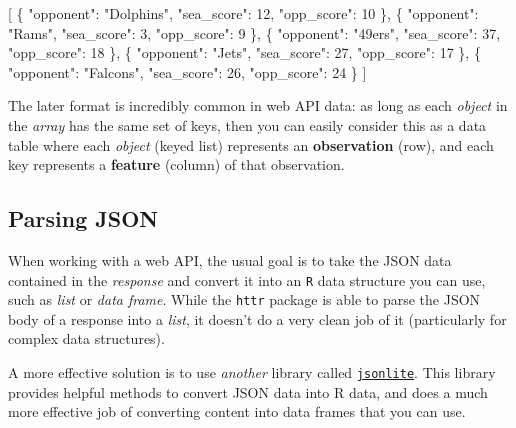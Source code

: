 \documentclass[]{book}
\newenvironment{Shaded}{\begin{snugshade}}{\end{snugshade}}
\newcommand{\DataTypeTok}[1]{\textcolor[rgb]{0.13,0.29,0.53}{#1}}
\newcommand{\DecValTok}[1]{\textcolor[rgb]{0.00,0.00,0.81}{#1}}
\newcommand{\StringTok}[1]{\textcolor[rgb]{0.31,0.60,0.02}{#1}}
\newcommand{\OtherTok}[1]{\textcolor[rgb]{0.56,0.35,0.01}{#1}}
\newcommand{\FunctionTok}[1]{\textcolor[rgb]{0.00,0.00,0.00}{#1}}
\theoremstyle{definition}
\theoremstyle{definition}
\theoremstyle{remark}
\begin{document}
\begin{Shaded}
\begin{Highlighting}[]
\OtherTok{[}
  \FunctionTok{\{} \DataTypeTok{"opponent"}\FunctionTok{:} \StringTok{"Dolphins"}\FunctionTok{,} \DataTypeTok{"sea_score"}\FunctionTok{:} \DecValTok{12}\FunctionTok{,} \DataTypeTok{"opp_score"}\FunctionTok{:} \DecValTok{10} \FunctionTok{\}}\OtherTok{,}
  \FunctionTok{\{} \DataTypeTok{"opponent"}\FunctionTok{:} \StringTok{"Rams"}\FunctionTok{,} \DataTypeTok{"sea_score"}\FunctionTok{:} \DecValTok{3}\FunctionTok{,} \DataTypeTok{"opp_score"}\FunctionTok{:} \DecValTok{9} \FunctionTok{\}}\OtherTok{,}
  \FunctionTok{\{} \DataTypeTok{"opponent"}\FunctionTok{:} \StringTok{"49ers"}\FunctionTok{,} \DataTypeTok{"sea_score"}\FunctionTok{:} \DecValTok{37}\FunctionTok{,} \DataTypeTok{"opp_score"}\FunctionTok{:} \DecValTok{18} \FunctionTok{\}}\OtherTok{,}
  \FunctionTok{\{} \DataTypeTok{"opponent"}\FunctionTok{:} \StringTok{"Jets"}\FunctionTok{,} \DataTypeTok{"sea_score"}\FunctionTok{:} \DecValTok{27}\FunctionTok{,} \DataTypeTok{"opp_score"}\FunctionTok{:} \DecValTok{17} \FunctionTok{\}}\OtherTok{,}
  \FunctionTok{\{} \DataTypeTok{"opponent"}\FunctionTok{:} \StringTok{"Falcons"}\FunctionTok{,} \DataTypeTok{"sea_score"}\FunctionTok{:} \DecValTok{26}\FunctionTok{,} \DataTypeTok{"opp_score"}\FunctionTok{:} \DecValTok{24} \FunctionTok{\}}
\OtherTok{]}
\end{Highlighting}
\end{Shaded}

The later format is incredibly common in web API data: as long as each
\emph{object} in the \emph{array} has the same set of keys, then you can
easily consider this as a data table where each \emph{object} (keyed
list) represents an \textbf{observation} (row), and each key represents
a \textbf{feature} (column) of that observation.

\subsection{Parsing JSON}\label{parsing-json}

When working with a web API, the usual goal is to take the JSON data
contained in the \emph{response} and convert it into an \texttt{R} data
structure you can use, such as \emph{list} or \emph{data frame}. While
the \texttt{httr} package is able to parse the JSON body of a response
into a \emph{list}, it doesn't do a very clean job of it (particularly
for complex data structures).

A more effective solution is to use \emph{another} library called
\href{https://cran.r-project.org/web/packages/jsonlite/jsonlite.pdf}{\texttt{jsonlite}}.
This library provides helpful methods to convert JSON data into R data,
and does a much more effective job of converting content into data
frames that you can use.
\end{document}
